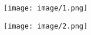 \begin{figure}[htbp]
    \centering
    \begin{minipage}[t]{0.46\textwidth}
        \centering
        \texttt{[image: image/1.png]}
    \end{minipage}
    \begin{minipage}[t]{0.46\textwidth}
        \centering
        \texttt{[image: image/2.png]}
    \end{minipage}
\end{figure}